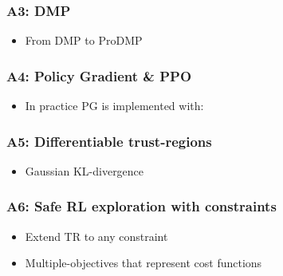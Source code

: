 \documentclass[navbaroff]{sdqbeamer}
\begin{document}
\begin{frame}[label={app3}]
\frametitle{A3: DMP}
\begin{itemize}
    \item From DMP to ProDMP
\end{itemize}
\end{frame}

\begin{frame}[label={app4}]
\frametitle{A4: Policy Gradient \& PPO \Fontsmaller}
\begin{itemize}
    \item In practice PG is implemented with: \\
\end{itemize}
\end{frame}

\begin{frame}[label={app5}]
\frametitle{A5: Differentiable trust-regions}
\begin{itemize}
    \item Gaussian KL-divergence
\end{itemize}
\end{frame}

\begin{frame}[label={app6}]
\frametitle{A6: Safe RL exploration with constraints}
\begin{itemize}
    \item Extend TR to any constraint
    \item Multiple-objectives that represent cost functions
\end{itemize}
\end{frame}
\end{document}
